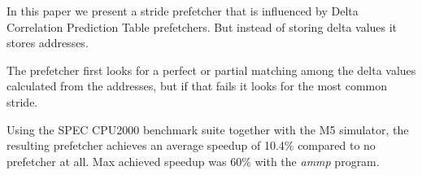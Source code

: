 In this paper we present a stride prefetcher that is influenced by Delta Correlation
Prediction Table prefetchers. But instead of storing delta values it stores addresses.

The prefetcher first looks for a perfect or partial matching among the delta values calculated from the 
addresses, but if that fails it looks for the most common stride.

Using the SPEC CPU2000 benchmark suite together with the M5 simulator, the resulting 
prefetcher achieves an average speedup of 10.4\% compared to no prefetcher at all.
Max achieved speedup was 60\% with the \emph{ammp} program. 


